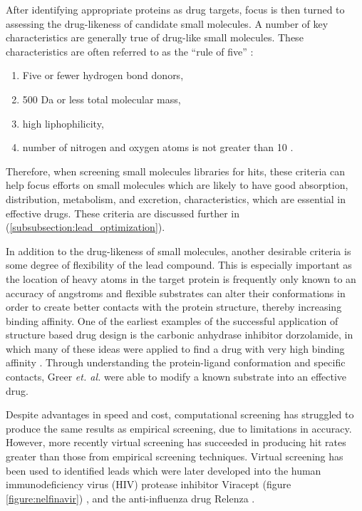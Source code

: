 After identifying appropriate proteins as drug targets, focus is then turned to assessing the drug-likeness of candidate small molecules.
A number of key characteristics are generally true of drug-like small molecules.
These characteristics are often referred to as the ``rule of five'' \cite{lipinski2004lead,hopkins2002druggable}:
\begin{enumerate}
\item Five or fewer hydrogen bond donors,
\item 500 Da or less total molecular mass,
\item high liphophilicity,
\item number of nitrogen and oxygen atoms is not greater than 10 \cite{rule_of_five}.
\end{enumerate}
Therefore, when screening small molecules libraries for hits, these criteria can help focus efforts on small molecules which are likely to have good absorption, distribution, metabolism, and excretion, characteristics, which are essential in effective drugs.
These criteria are discussed further in  (\ref{subsubsection:lead_optimization}).

In addition to the drug-likeness of small molecules, another desirable criteria is some degree of flexibility of the lead compound.
This is especially important as the location of heavy atoms in the target protein is frequently only known to an accuracy of  angstroms and flexible substrates can alter their conformations in order to create better contacts with the protein structure, thereby increasing binding affinity.
One of the earliest examples of the successful application of structure based drug design is the carbonic anhydrase inhibitor dorzolamide, in which many of these ideas were applied to find a drug with very high binding affinity \cite{greer1994application}.
Through understanding the protein-ligand conformation and specific contacts, Greer {\it et. al.} were able to modify a known substrate into an effective drug. 


Despite advantages in speed and cost, computational screening has struggled to produce the same results as empirical screening, due to limitations in accuracy.
However, more recently virtual screening has succeeded in producing hit rates greater than those from empirical screening techniques.
Virtual screening has been used to identified leads which were later developed into the human immunodeficiency virus (HIV) protease inhibitor Viracept (figure \ref{figure:nelfinavir}) \cite{kaldor1997viracept}, and the anti-influenza drug Relenza \cite{von1993rational,shoichet2004virtual}.

